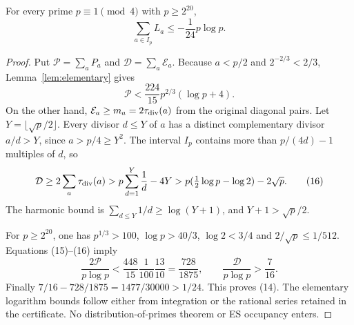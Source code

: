 \begin{theorem}
\label{thm:negative}
For every prime $p\equiv1\pmod4$ with $p\ge2^{20}$,
\[
 \boxed{\sum_{a\in I_p}L_a\le-\frac1{24}p\log p.}        \tag{14}
\]
\end{theorem}
\begin{proof}
Put $\mathcal P=\sum_aP_a$ and $\mathcal D=\sum_a\mathcal E_a$.
Because $a<p/2$ and $2^{-2/3}<2/3$, Lemma~\ref{lem:elementary} gives
\[
 \mathcal P<\frac{224}{15}p^{2/3}(\log p+4).             \tag{15}
\]
On the other hand, $\mathcal E_a\ge m_a=2\tau_{\rm div}(a)$ from the original
diagonal pairs. Let $Y=\lfloor\sqrt p/2\rfloor$. Every divisor $d\le Y$ of
$a$ has a distinct complementary divisor $a/d>Y$, since $a>p/4\ge Y^2$.
The interval $I_p$ contains more than $p/(4d)-1$ multiples of $d$, so
\[
 \mathcal D\ge2\sum_a\tau_{\rm div}(a)
 >p\sum_{d=1}^Y\frac1d-4Y
 >p(\tfrac12\log p-\log2)-2\sqrt p.                    \tag{16}
\]
The harmonic bound is $\sum_{d\le Y}1/d\ge\log(Y+1)$, and $Y+1>\sqrt p/2$.

For $p\ge2^{20}$, one has $p^{1/3}>100$, $\log p>40/3$, $\log2<3/4$ and
$2/\sqrt p\le1/512$. Equations (15)--(16) imply
\[
 \frac{2\mathcal P}{p\log p}
 <\frac{448}{15}\frac1{100}\frac{13}{10}
 =\frac{728}{1875},\qquad
 \frac{\mathcal D}{p\log p}>\frac7{16}.
\]
Finally $7/16-728/1875=1477/30000>1/24$. This proves (14). The elementary
logarithm bounds follow either from integration or the rational series retained
in the certificate. No distribution-of-primes theorem or ES occupancy enters.
\end{proof}

